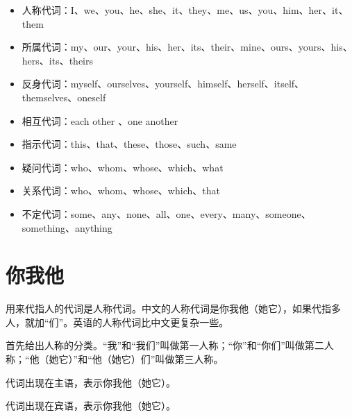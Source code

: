 \documentclass[10.5pt, a4paper]{ctexbook} %
\begin{document}
\begin{itemize}
    \item 人称代词：I、we、you、he、she、it、they、me、us、you、him、her、it、them
    \item 所属代词：my、our、your、his、her、its、their、mine、ours、yours、his、hers、its、theirs
    \item 反身代词：myself、ourselves、yourself、himself、herself、itself、themselves、oneself
    \item 相互代词：each other 、one another
    \item 指示代词：this、that、these、those、such、same
    \item 疑问代词：who、whom、whose、which、what
    \item 关系代词：who、whom、whose、which、that
    \item 不定代词：some、any、none、all、one、every、many、someone、something、anything
\end{itemize}

\section{你我他}

用来代指人的代词是人称代词。中文的人称代词是你我他（她它），如果代指多人，就加“们”。英语的人称代词比中文更复杂一些。

首先给出人称的分类。“我”和“我们”叫做第一人称；“你”和“你们”叫做第二人称；“他（她它）”和“他（她它）们”叫做第三人称。

代词出现在主语，表示你我他（她它）。

\begin{liju}
\end{liju}

代词出现在宾语，表示你我他（她它）。

\begin{liju}
\end{liju}
\end{document}
